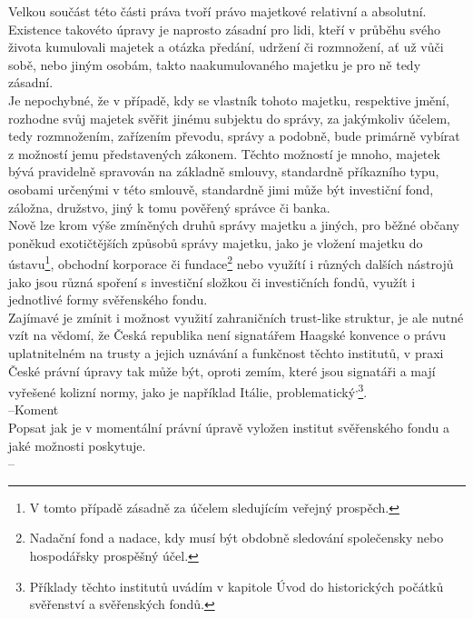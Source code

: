\documentclass{article}
\begin{document}
Velkou součást této části práva tvoří právo majetkové relativní a absolutní. Existence takovéto úpravy je naprosto zásadní pro lidi, kteří v průběhu svého života kumulovali majetek a otázka předání, udržení či rozmnožení, ať už vůči sobě, nebo jiným osobám, takto naakumulovaného majetku je pro ně tedy zásadní.\\

Je nepochybné, že v případě, kdy se vlastník tohoto majetku, respektive jmění, rozhodne svůj majetek svěřit jinému subjektu do správy, za jakýmkoliv účelem, tedy rozmnožením, zařízením převodu, správy a podobně, bude primárně vybírat z možností jemu představených zákonem. Těchto možností je mnoho, majetek bývá pravidelně spravován na základně smlouvy, standardně příkazního typu, osobami určenými v této smlouvě, standardně jimi může být investiční fond, záložna, družstvo, jiný k tomu pověřený správce či banka.\\

Nově lze krom výše zmíněných druhů správy majetku a jiných, pro běžné občany poněkud exotičtějších způsobů správy majetku, jako je vložení majetku do ústavu\footnote{V tomto případě zásadně za účelem sledujícím veřejný prospěch.}, obchodní korporace či fundace\footnote{Nadační fond a nadace, kdy musí být obdobně sledování společensky nebo hospodářsky prospěšný účel.} nebo využítí i různých dalších nástrojů jako jsou různá spoření s investiční složkou či investičních fondů, využít i jednotlivé formy svěřenského fondu.\\

Zajímavé je zmínit i možnost využití zahraničních trust-like struktur, je ale nutné vzít na vědomí, že Česká republika není signatářem Haagské konvence o právu uplatnitelném na trusty a jejich uznávání a funkčnost těchto institutů, v praxi České právní úpravy tak může být, oproti zemím, které jsou signatáři a mají vyřešené kolizní normy, jako je například Itálie, problematický\textsuperscript{,}\footnote{Příklady těchto institutů uvádím v kapitole Úvod do historických počátků svěřenství a svěřenských fondů.}.\\



--Koment\\
Popsat jak je v momentální právní úpravě vyložen institut svěřenského fondu a jaké možnosti poskytuje. \\
--\\
\end{document}
